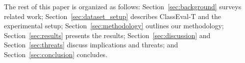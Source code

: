 The rest of this paper is organized as follows: Section~\ref{sec:background} surveys related work; Section~\ref{sec:dataset_setup} describes ClassEval-T and the experimental setup; Section~\ref{sec:methodology} outlines our methodology; Section~\ref{sec:results} presents the results; Section~\ref{sec:discussion} and Section~\ref{sec:threats} discuss implications and threats; and Section~\ref{sec:conclusion} concludes.
